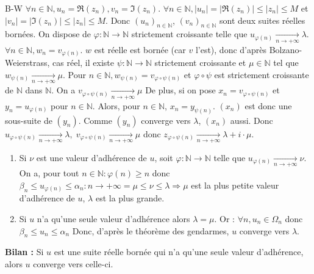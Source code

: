 \documentclass[12pt,a4paper]{report}
\begin{document}
\begin{demonstration}{B-W}
\newline $\forall n \in \mathbb{N}, u_n = \Re(z_n), v_n = \Im(z_n)$.
\newline $\forall n \in \mathbb{N}, \lvert u_n \rvert = \lvert \Re(z_n) \rvert \leq \lvert z_n \rvert \leq M$ et $\lvert v_n \rvert = \lvert \Im(z_n) \rvert  \leq \lvert z_n \rvert \leq M$.
\newline Donc $(u_n)_{n \in \mathbb{N}}$, $(v_n)_{n \in \mathbb{N}}$ sont deux suites réelles bornées.
\newline On dispose de $\varphi : \mathbb{N} \rightarrow \mathbb{N}$ strictement croissante telle que $u_{\varphi(n)} \xrightarrow[n \rightarrow +\infty]{} \lambda$.
\newline $\forall n \in \mathbb{N}, w_n = v_{\varphi(n)}$.
\newline $w$ est réelle est bornée (car $v$ l'est), donc d'après Bolzano-Weierstrass, cas réel, il existe $\psi : \mathbb{N} \rightarrow \mathbb{N}$ strictement croissante et $\mu \in \mathbb{N}$ tel que $w_{\psi(n)} \xrightarrow[n \rightarrow +\infty]{} \mu$.
\newline Pour $n \in \mathbb{N}, w_{\psi(n)} = v_{\varphi \circ \psi(n)}$ et $\varphi \circ \psi$ est strictement croissante de $\mathbb{N}$ dans $\mathbb{N}$. On a $v_{\varphi \circ \psi(n)} \xrightarrow[n \rightarrow +\infty]{} \mu$
\newline De plus, si on pose $x_n = v_{\varphi \circ \psi(n)}$ et $y_n = u_{\varphi(n)}$ pour $n \in \mathbb{N}$. Alors, pour $n \in \mathbb{N}$, $x_n = y_{\psi(n)}$.
\newline $(x_n)$ est donc une sous-suite de $(y_n)$. Comme $(y_n)$ converge vers $\lambda$, $(x_n)$ aussi.
\newline Donc $u_{\varphi \circ \psi(n)} \xrightarrow[n \rightarrow +\infty]{} \lambda, \; v_{\varphi \circ \psi(n)} \xrightarrow[n \rightarrow +\infty]{} \mu$
\newline donc $z_{\varphi \circ \psi(n)} \xrightarrow[n \rightarrow +\infty]{} \lambda + i\cdot \mu$.

\begin{remarque}{}
\begin{enumerate}
\item Si $\nu$ est une valeur d'adhérence de $u$, soit $\varphi : \mathbb{N} \rightarrow \mathbb{N}$ telle que $u_{\varphi(n)} \xrightarrow[n \rightarrow +\infty]{} \nu$. On a, pour tout $n \in \mathbb{N} :\varphi(n) \geq n$ 
\newline donc $\beta_n \leq u_{\varphi(n)} \leq \alpha_n : n \rightarrow +\infty = \mu \leq \nu \leq \lambda \Longrightarrow \mu$ est la plus petite valeur d'adhérence de $u$, $\lambda$ est la plus grande.
\item Si $u$ n'a qu'une seule valeur d'adhérence alors $\lambda = \mu$. Or : $\forall n, u_n \in \Omega_n$ donc $\beta_n \leq u_n \leq \alpha_n$ Donc, d'après le théorème des gendarmes, $u$ converge vers $\lambda$.
\end{enumerate}
\end{remarque}


\textbf{Bilan :} Si $u$ est une suite réelle bornée qui n'a qu'une seule valeur d'adhérence, alors $u$ converge vers celle-ci.
\end{demonstration}
\end{document}
